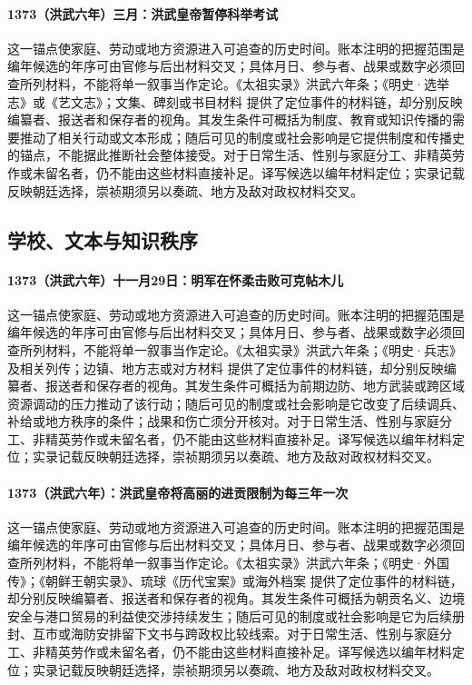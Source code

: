 \paragraph{1373（洪武六年）三月：洪武皇帝暂停科举考试} 这一锚点使家庭、劳动或地方资源进入可追查的历史时间。账本注明的把握范围是编年候选的年序可由官修与后出材料交叉；具体月日、参与者、战果或数字必须回查所列材料，不能将单一叙事当作定论。《太祖实录》洪武六年条；《明史·选举志》或《艺文志》；文集、碑刻或书目材料 提供了定位事件的材料链，却分别反映编纂者、报送者和保存者的视角。其发生条件可概括为制度、教育或知识传播的需要推动了相关行动或文本形成；随后可见的制度或社会影响是它提供制度和传播史的锚点，不能据此推断社会整体接受。对于日常生活、性别与家庭分工、非精英劳作或未留名者，仍不能由这些材料直接补足。译写候选以编年材料定位；实录记载反映朝廷选择，崇祯期须另以奏疏、地方及敌对政权材料交叉。

\subsection{学校、文本与知识秩序}

\paragraph{1373（洪武六年）十一月29日：明军在怀柔击败可克帖木儿} 这一锚点使家庭、劳动或地方资源进入可追查的历史时间。账本注明的把握范围是编年候选的年序可由官修与后出材料交叉；具体月日、参与者、战果或数字必须回查所列材料，不能将单一叙事当作定论。《太祖实录》洪武六年条；《明史·兵志》及相关列传；边镇、地方志或对方材料 提供了定位事件的材料链，却分别反映编纂者、报送者和保存者的视角。其发生条件可概括为前期边防、地方武装或跨区域资源调动的压力推动了该行动；随后可见的制度或社会影响是它改变了后续调兵、补给或地方秩序的条件；战果和伤亡须分开核对。对于日常生活、性别与家庭分工、非精英劳作或未留名者，仍不能由这些材料直接补足。译写候选以编年材料定位；实录记载反映朝廷选择，崇祯期须另以奏疏、地方及敌对政权材料交叉。

\paragraph{1373（洪武六年）：洪武皇帝将高丽的进贡限制为每三年一次} 这一锚点使家庭、劳动或地方资源进入可追查的历史时间。账本注明的把握范围是编年候选的年序可由官修与后出材料交叉；具体月日、参与者、战果或数字必须回查所列材料，不能将单一叙事当作定论。《太祖实录》洪武六年条；《明史·外国传》；《朝鲜王朝实录》、琉球《历代宝案》或海外档案 提供了定位事件的材料链，却分别反映编纂者、报送者和保存者的视角。其发生条件可概括为朝贡名义、边境安全与港口贸易的利益使交涉持续发生；随后可见的制度或社会影响是它为后续册封、互市或海防安排留下文书与跨政权比较线索。对于日常生活、性别与家庭分工、非精英劳作或未留名者，仍不能由这些材料直接补足。译写候选以编年材料定位；实录记载反映朝廷选择，崇祯期须另以奏疏、地方及敌对政权材料交叉。

